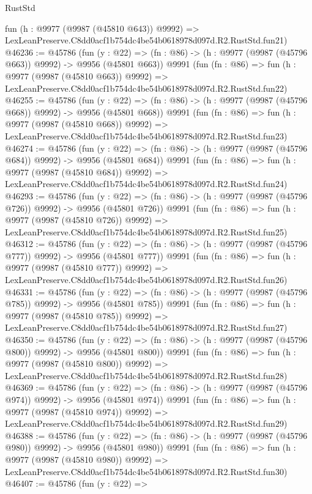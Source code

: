 \begin{lexlean}{RustStd}
\begin{coremodule}
    fun (h : @9977 (@9987 (@45810 @643)) @9992) =>
    LexLeanPreserve.C8dd0acf1b754dc4be54b0618978d097d.R2.RustStd.fun21)
@46236 := @45786
    (fun (y : @22) => (fn : @86) -> (h : @9977 (@9987 (@45796 @663)) @9992) -> @9956 (@45801 @663))
    @9991
    (fun (fn : @86) =>
    fun (h : @9977 (@9987 (@45810 @663)) @9992) =>
    LexLeanPreserve.C8dd0acf1b754dc4be54b0618978d097d.R2.RustStd.fun22)
@46255 := @45786
    (fun (y : @22) => (fn : @86) -> (h : @9977 (@9987 (@45796 @668)) @9992) -> @9956 (@45801 @668))
    @9991
    (fun (fn : @86) =>
    fun (h : @9977 (@9987 (@45810 @668)) @9992) =>
    LexLeanPreserve.C8dd0acf1b754dc4be54b0618978d097d.R2.RustStd.fun23)
@46274 := @45786
    (fun (y : @22) => (fn : @86) -> (h : @9977 (@9987 (@45796 @684)) @9992) -> @9956 (@45801 @684))
    @9991
    (fun (fn : @86) =>
    fun (h : @9977 (@9987 (@45810 @684)) @9992) =>
    LexLeanPreserve.C8dd0acf1b754dc4be54b0618978d097d.R2.RustStd.fun24)
@46293 := @45786
    (fun (y : @22) => (fn : @86) -> (h : @9977 (@9987 (@45796 @726)) @9992) -> @9956 (@45801 @726))
    @9991
    (fun (fn : @86) =>
    fun (h : @9977 (@9987 (@45810 @726)) @9992) =>
    LexLeanPreserve.C8dd0acf1b754dc4be54b0618978d097d.R2.RustStd.fun25)
@46312 := @45786
    (fun (y : @22) => (fn : @86) -> (h : @9977 (@9987 (@45796 @777)) @9992) -> @9956 (@45801 @777))
    @9991
    (fun (fn : @86) =>
    fun (h : @9977 (@9987 (@45810 @777)) @9992) =>
    LexLeanPreserve.C8dd0acf1b754dc4be54b0618978d097d.R2.RustStd.fun26)
@46331 := @45786
    (fun (y : @22) => (fn : @86) -> (h : @9977 (@9987 (@45796 @785)) @9992) -> @9956 (@45801 @785))
    @9991
    (fun (fn : @86) =>
    fun (h : @9977 (@9987 (@45810 @785)) @9992) =>
    LexLeanPreserve.C8dd0acf1b754dc4be54b0618978d097d.R2.RustStd.fun27)
@46350 := @45786
    (fun (y : @22) => (fn : @86) -> (h : @9977 (@9987 (@45796 @800)) @9992) -> @9956 (@45801 @800))
    @9991
    (fun (fn : @86) =>
    fun (h : @9977 (@9987 (@45810 @800)) @9992) =>
    LexLeanPreserve.C8dd0acf1b754dc4be54b0618978d097d.R2.RustStd.fun28)
@46369 := @45786
    (fun (y : @22) => (fn : @86) -> (h : @9977 (@9987 (@45796 @974)) @9992) -> @9956 (@45801 @974))
    @9991
    (fun (fn : @86) =>
    fun (h : @9977 (@9987 (@45810 @974)) @9992) =>
    LexLeanPreserve.C8dd0acf1b754dc4be54b0618978d097d.R2.RustStd.fun29)
@46388 := @45786
    (fun (y : @22) => (fn : @86) -> (h : @9977 (@9987 (@45796 @980)) @9992) -> @9956 (@45801 @980))
    @9991
    (fun (fn : @86) =>
    fun (h : @9977 (@9987 (@45810 @980)) @9992) =>
    LexLeanPreserve.C8dd0acf1b754dc4be54b0618978d097d.R2.RustStd.fun30)
@46407 := @45786
    (fun (y : @22) =>

\end{coremodule}
\end{lexlean}
